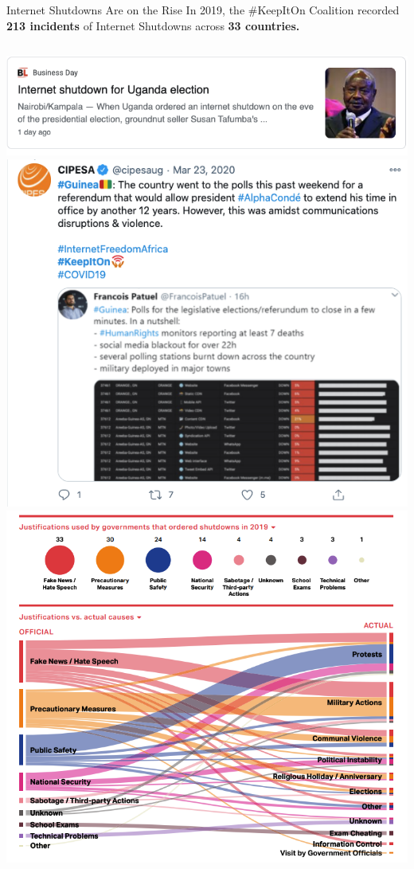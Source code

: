 \documentclass[nobackground,dvipsnames,table]{beamer}
\begin{document}
\begin{frame}{Internet Shutdowns Are on the Rise}
    \small{In 2019, the \#KeepItOn Coalition recorded \textbf{213 incidents} of Internet Shutdowns across \textbf{33 countries.}}
    \begin{columns}
            \includegraphics[width=\textwidth]{unganda-internet-shutdown}
            \includegraphics[width=\textwidth]{guinea-internet-disruptions}
            \includegraphics[width=\textwidth]{shutdown-justifications}
    \end{columns}
\end{frame}
\end{document}
